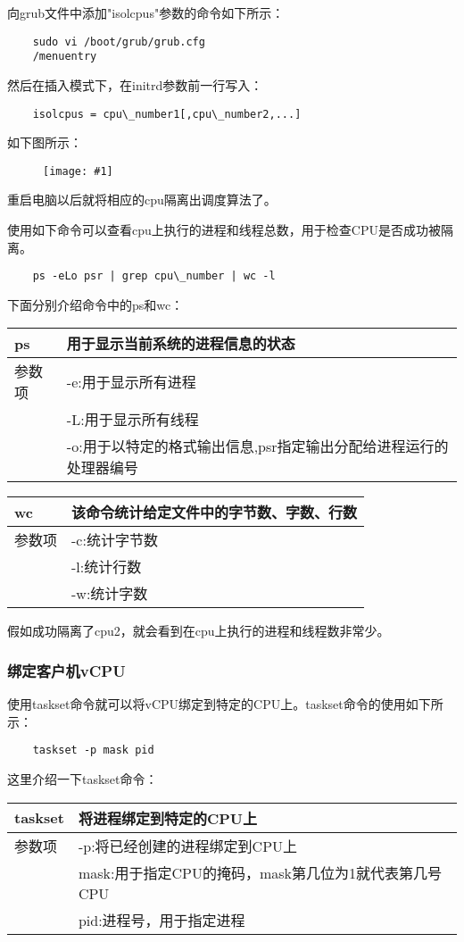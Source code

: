 \documentclass[a4paper,left=2.5cm,right=2.5cm,11pt]{article}
\newcommand{\fic}[1]{\begin{figure}[H]
		\center
		\texttt{[image: \#1]}
	\end{figure}}
\newcommand{\interval}{\vspace{0.5em}}
\newcommand{\tablestart}{
 	\interval
 	\begin{longtable}{p{2cm}p{10cm}}
 	\hline}
\newcommand{\tableend}{
 	\hline
 	\end{longtable}
 	\interval}
\begin{document}
	向grub文件中添加"isolcpus"参数的命令如下所示：
	\begin{lstlisting}
	sudo vi /boot/grub/grub.cfg
	/menuentry
	\end{lstlisting}

	然后在插入模式下，在initrd参数前一行写入：
	\begin{lstlisting}
	isolcpus = cpu\_number1[,cpu\_number2,...]
	\end{lstlisting}

	如下图所示：
	\fic{7.png}

	重启电脑以后就将相应的cpu隔离出调度算法了。\par

	使用如下命令可以查看cpu上执行的进程和线程总数，用于检查CPU是否成功被隔离。

	\begin{lstlisting}
	ps -eLo psr | grep cpu\_number | wc -l
	\end{lstlisting}

	下面分别介绍命令中的ps和wc：
	\tablestart
	ps & 用于显示当前系统的进程信息的状态\\
	\hline
	参数项 & -e:用于显示所有进程 \\
		& -L:用于显示所有线程 \\
		& -o:用于以特定的格式输出信息,psr指定输出分配给进程运行的处理器编号 \\
	\tableend

	\tablestart
	wc & 该命令统计给定文件中的字节数、字数、行数 \\
	\hline
	参数项 & -c:统计字节数 \\
		  & -l:统计行数 \\
		  & -w:统计字数 \\
	\tableend

	假如成功隔离了cpu2，就会看到在cpu上执行的进程和线程数非常少。

\subsubsection{绑定客户机vCPU}
	使用taskset命令就可以将vCPU绑定到特定的CPU上。taskset命令的使用如下所示：
	\begin{lstlisting}
	taskset -p mask pid
	\end{lstlisting}

	这里介绍一下taskset命令：
	\tablestart
	taskset & 将进程绑定到特定的CPU上 \\
	\hline
	参数项 & -p:将已经创建的进程绑定到CPU上 \\
		 & mask:用于指定CPU的掩码，mask第几位为1就代表第几号CPU \\
		 & pid:进程号，用于指定进程 \\
	\tableend
\end{document}
